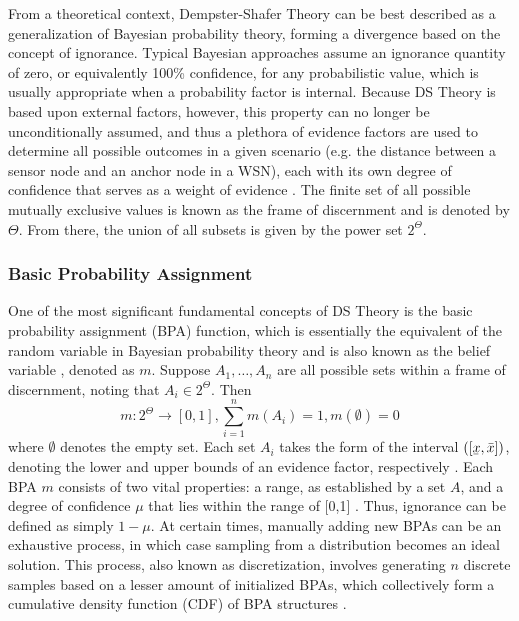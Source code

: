 \documentclass[12pt]{uthesis-v12}  %
\newcommand{\ubar}[1]{\underaccent{\bar}{#1}}
\begin{document}
From a theoretical context, Dempster-Shafer Theory can be best described as a generalization of Bayesian probability theory, forming a divergence based on the concept of ignorance. Typical Bayesian approaches assume an ignorance quantity of zero, or equivalently 100\% confidence, for any probabilistic value, which is usually appropriate when a probability factor is internal. Because DS Theory is based upon external factors, however, this property can no longer be unconditionally assumed, and thus a plethora of evidence factors are used to determine all possible outcomes in a given scenario (e.g. the distance between a sensor node and an anchor node in a WSN), each with its own degree of confidence that serves as a weight of evidence \cite{shafer}. The finite set of all possible mutually exclusive values is known as the frame of discernment and is denoted by $\Theta$. From there, the union of all subsets is given by the power set $2^\Theta$.

\subsubsection{Basic Probability Assignment}

One of the most significant fundamental concepts of DS Theory is the basic probability assignment (BPA) function, which is essentially the equivalent of the random variable in Bayesian probability theory and is also known as the belief variable \cite{auer}, denoted as $m$. Suppose $A_1,\dots,A_n$ are all possible sets within a frame of discernment, noting that $A_i \in 2^\Theta$. Then
\begin{equation}
m: 2^\Theta \rightarrow [0,1], \sum\limits_{i=1}^n m(A_i) = 1, m(\emptyset) = 0
\label{init}
\end{equation}
\noindent where $\emptyset$ denotes the empty set. Each set $A_i$ takes the form of the interval $([\ubar{x},\bar{x}])$, denoting the lower and upper bounds of an evidence factor, respectively \cite{auer}. Each BPA $m$ consists of two vital properties: a range, as established by a set $A$, and a degree of confidence $\mu$ that lies within the range of [0,1] \cite{dempster}. Thus, ignorance can be defined as simply $1 - \mu$. At certain times, manually adding new BPAs can be an exhaustive process, in which case sampling from a distribution becomes an ideal solution. This process, also known as discretization, involves generating $n$ discrete samples based on a lesser amount of initialized BPAs, which collectively form a cumulative density function (CDF) of BPA structures \cite{tonon}.
\end{document}
